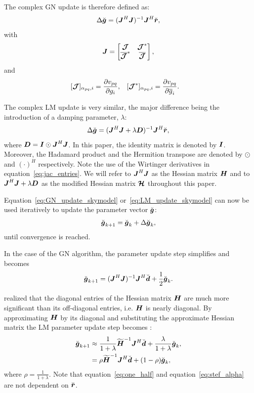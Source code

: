 \documentclass[useAMS,usenatbib]{mn2e}
\newcommand{\br}{\bmath{r}}
\newcommand{\bg}{\bmath{g}}
\newcommand{\bd}{\bmath{d}}
\newcommand{\bJ}{\bmath{J}}
\newcommand{\bD}{\bmath{D}}
\newcommand{\bH}{\bmath{H}}
\newcommand{\bI}{\bmath{I}}
\newcommand{\bmJ}{\bmath{\mathcal{J}}}
\newcommand{\bmH}{\bmath{\mathcal{H}}}
\newcommand{\conj}[1]{\overline{#1}}
\begin{document}
The complex GN update is therefore defined as:
\begin{equation}
\label{eq:GN_update_skymodel}
 \Delta \breve{\bg} = (\bJ^H\bJ)^{-1}\bJ^H\breve{\br},
\end{equation}
with 
\begin{equation}
\label{eq:Jacobian_skymodel}
\bJ = \begin{bmatrix}
       \bmJ & \bmJ^*\\
       \conj{\bmJ}^* & \conj{\bmJ} 
      \end{bmatrix},
\end{equation}
and
\begin{align}
\label{eq:jac_entries}
[\bmJ]_{\alpha_{pq},i} &= \frac{\partial v_{pq}}{\partial g_i}, & [\bmJ^*]_{\alpha_{pq},i} &= \frac{\partial v_{pq}}{\partial \conj{g}_i}. 
\end{align}

The complex LM update is very similar, the major difference being the introduction of a damping parameter, $\lambda$:
\begin{equation}
\label{eq:LM_update_skymodel}
\Delta \breve{\bg} = (\bJ^H\bJ + \lambda\bD)^{-1}\bJ^H\breve{\br},
\end{equation}
where $\bD=\bI\odot\bJ^H\bJ$. In this paper, the identity matrix is denoted by $\bI$. Moreover, the Hadamard product and the Hermition transpose are denoted by $\odot$ and $(\cdot)^H$ respectively. Note the use of the Wirtinger derivatives in equation~\ref{eq:jac_entries}.
We will refer to $\bJ^H\bJ$ as the Hessian matrix $\bH$ and to $\bJ^H\bJ + \lambda\bD$ as the modified Hessian matrix $\bmH$ throughout this paper. 

Equation~\ref{eq:GN_update_skymodel} or~\ref{eq:LM_update_skymodel} can now be used iteratively to update the parameter vector $\breve{\bg}$:
\begin{equation}
\label{eq:update_skymodel}
\breve{\bg}_{k+1} = \breve{\bg}_{k} + \Delta \breve{\bg}_{k},
\end{equation}
until convergence is reached.

In the case of the GN algorithm, the parameter update step simplifies and becomes \citep{Smirnov2015}
\begin{equation}
\label{eq:one_half}
\breve{\bg}_{k+1} = (\bJ^H\bJ)^{-1}\bJ^H\breve{\bd} + \frac{1}{2}\breve{\bg}_{k}. 
\end{equation}


\citet{Smirnov2015} realized that the diagonal entries of the Hessian matrix $\bH$ are much more significant than its off-diagonal entries, i.e. $\bH$ is nearly diagonal. By approximating $\bH$ by its diagonal and substituting the approximate Hessian matrix the LM parameter update step becomes \citep{Smirnov2015}:
\begin{align}
\breve{\bg}_{k+1} &\approx \frac{1}{1+\lambda}\widetilde{\bH}^{-1}\bJ^H\breve{\bd} + \frac{\lambda}{1+\lambda} \breve{\bg}_k, \nonumber \\
 &= \rho \widetilde{\bH}^{-1}\bJ^H\breve{\bd} + (1-\rho)\breve{\bg}_k, 
\label{eq:stef_alpha}  
\end{align}
where $\rho = \frac{1}{1+\lambda}$. Note that equation~\ref{eq:one_half} and equation~\ref{eq:stef_alpha} are   
not dependent on $\breve{\br}$. 
\end{document}
